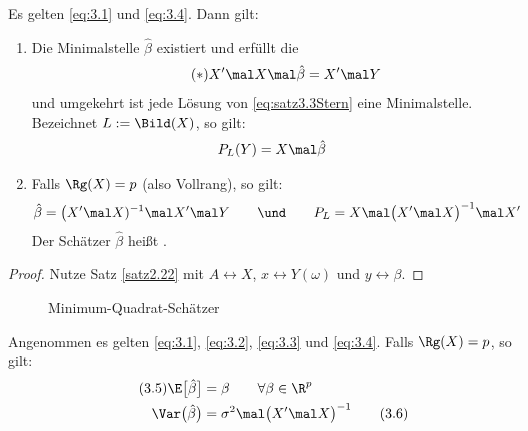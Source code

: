 \begin{satz}\label{satz3.3}
	Es gelten \eqref{eq:3.1} und \eqref{eq:3.4}.
	Dann gilt:
	\begin{enumerate}[label=(\arabic*)]
		\item Die Minimalstelle $\hat{\beta}$ existiert und erfüllt die  \label{item:satz3.3(1)}
		\begin{align}\label{eq:satz3.3Stern}\tag{$*$}
			X'\mal X\mal\hat{\beta}=X'\mal Y
		\end{align}
		und umgekehrt ist jede Lösung von \eqref{eq:satz3.3Stern} eine Minimalstelle.\\
		Bezeichnet $L:=\Bild(X)$, so gilt:
		\begin{align*}
			P_L(Y)=X\mal\hat{\beta}
		\end{align*}
		\item Falls $\Rg(X)=p$ (also Vollrang), so gilt:\label{item:satz3.3(2)}
		\begin{align*}
			\hat{\beta}&=\big(X'\mal X)^{-1}\mal X'\mal Y
			\qquad\und\qquad
			P_L=X\mal\big(X'\mal X\big)^{-1}\mal X'
		\end{align*}
		Der Schätzer $\hat{\beta}$ heißt .
	\end{enumerate}
\end{satz}

\begin{proof}
	Nutze Satz \ref{satz2.22} mit $A\leftrightarrow X$, $x\leftrightarrow Y(\omega)$ und $y\leftrightarrow\beta$.
\end{proof}

\begin{figure}[H]
	\begin{center}
		
		\caption{Minimum-Quadrat-Schätzer}
		\label{Abb:MinQuaSchätzer}
	\end{center}
\end{figure}

\begin{satz}\label{satz3.4}
	Angenommen es gelten \eqref{eq:3.1}, \eqref{eq:3.2}, \eqref{eq:3.3} und \eqref{eq:3.4}.
	Falls $\Rg(X)=p$, so gilt:
	\begin{align}\label{eq:3.5}\tag{3.5}
		\E\big[\hat{\beta}\big]&=\beta\qquad\forall\beta\in\R^p\\
		\Var\big(\hat{\beta}\big)&=\sigma^2\mal\big(X'\mal X\big)^{-1}\label{eq:3.6}\tag{3.6}
	\end{align}
\end{satz}

